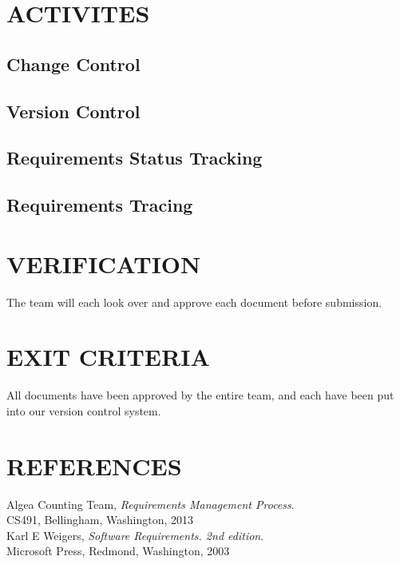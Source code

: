 \documentclass[11pt]{article}
\begin{document}
\section{ACTIVITES} 

	
\subsection{Change Control}
\subsection{Version Control} 
\subsection{Requirements Status Tracking}
\subsection{Requirements Tracing} 
   
\section{VERIFICATION}
The team will each look over and approve each document before submission.

\section{EXIT CRITERIA} 
All documents have been approved by the entire team, and each have been put into our version control system.

\section{REFERENCES} 

	Algea Counting Team,
	\emph{Requirements Management Process}. \\
	CS491, Bellingham, Washington, 2013\\

  Karl E Weigers,
  \emph{Software Requirements. 2nd edition}. \\
  Microsoft Press, Redmond, Washington, 2003
\end{document}
